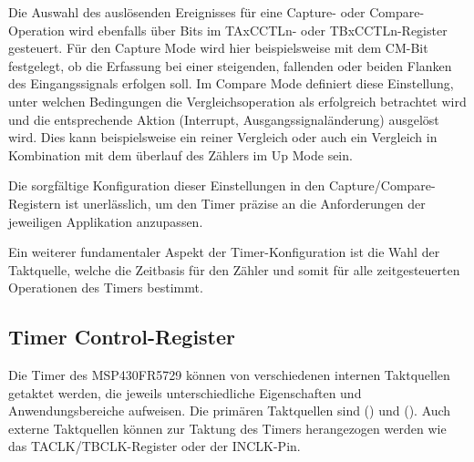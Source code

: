 Die Auswahl des ausl\"osenden Ereignisses f\"ur eine Capture- oder Compare-Operation wird ebenfalls \"uber Bits im TAxCCTLn- oder TBxCCTLn-Register gesteuert. F\"ur den Capture Mode wird hier beispielsweise mit dem CM-Bit festgelegt, ob die Erfassung bei einer steigenden, fallenden oder beiden Flanken des Eingangssignals erfolgen soll. Im Compare Mode definiert diese Einstellung, unter welchen Bedingungen die Vergleichsoperation als erfolgreich betrachtet wird und die entsprechende Aktion (Interrupt, Ausgangssignal\"anderung) ausgel\"ost wird. Dies kann beispielsweise ein reiner Vergleich oder auch ein Vergleich in Kombination mit dem \"uberlauf des Z\"ahlers im Up Mode sein. 

Die sorgf\"altige Konfiguration dieser Einstellungen in den Capture/Compare-Registern ist unerl\"asslich, um den Timer pr\"azise an die Anforderungen der jeweiligen Applikation anzupassen.

Ein weiterer fundamentaler Aspekt der Timer-Konfiguration ist \ua die Wahl der Taktquelle, welche die Zeitbasis f\"ur den Z\"ahler und somit f\"ur alle zeitgesteuerten Operationen des Timers bestimmt. \AI

\newpage
\subsection{Timer Control-Register}
\label{sec:TimerControlRegister}

Die Timer des MSP430FR5729 k\"onnen von verschiedenen internen Taktquellen getaktet werden, die jeweils unterschiedliche Eigenschaften und Anwendungsbereiche aufweisen. Die prim\"aren Taktquellen sind  () und  (). Auch externe Taktquellen k\"onnen zur Taktung des Timers herangezogen werden wie \zB das TACLK/TBCLK-Register oder der INCLK-Pin. 

